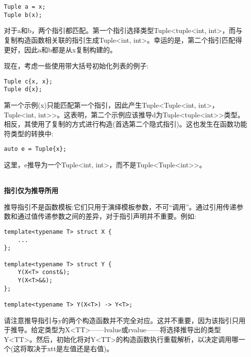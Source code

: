 \begin{lstlisting}[style=styleCXX]
Tuple a = x;
Tuple b(x);
\end{lstlisting}

对于a和b，两个指引都匹配。第一个指引选择类型Tuple<tuple<int, int>，而与复制构造函数相关联的指引生成Tuple<int, int>。幸运的是，第二个指引匹配得更好，因此a和b都是从x复制构建的。

现在，考虑一些使用带大括号初始化列表的例子:

\begin{lstlisting}[style=styleCXX]
Tuple c{x, x};
Tuple d{x};
\end{lstlisting}

第一个示例(x)只能匹配第一个指引，因此产生Tuple<Tuple<int, int>， Tuple<int, int>>。这表明，第二个示例应该推导d为Tuple<tuple<int>>类型。相反，其使用了复制的方式进行构造(首选第二个隐式指引)。这也发生在函数功能符类型的转换中:

\begin{lstlisting}[style=styleCXX]
auto e = Tuple{x};
\end{lstlisting}

这里，e推导为一个Tuple<int, int>，而不是Tuple<Tuple<int>>。

\hspace*{\fill} \\ %
\noindent
\textbf{指引仅为推导所用}

推导指引不是函数模板:它们只用于演绎模板参数，不可“调用”。通过引用传递参数和通过值传递参数之间的差异，对于指引声明并不重要。例如:

\begin{lstlisting}[style=styleCXX]
template<typename T> struct X {
	...
};

template<typename T> struct Y {
	Y(X<T> const&);
	Y(X<T>&&);
};

template<typename T> Y(X<T>) -> Y<T>;
\end{lstlisting}

请注意推导指引与y的两个构造函数并不完全对应。这并不重要，因为该指引只用于推导。给定类型为X<TT>——lvalue或rvalue——将选择推导出的类型Y<TT>。然后，初始化将对Y<TT>的构造函数执行重载解析，以决定调用哪一个(这将取决于xtt是左值还是右值)。






